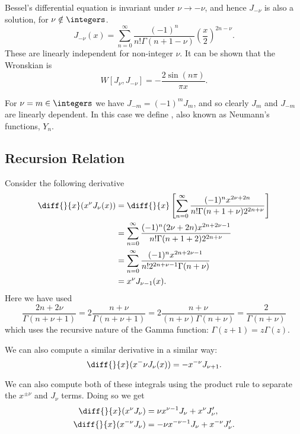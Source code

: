 \documentclass[fleqn]{NotesClass}
\begin{document}
    Bessel's differential equation is invariant under \(\nu \to -\nu\), and hence \(J_{-\nu}\) is also a solution, for \(\nu \notin \integers\).
    \begin{equation}
        J_{-\nu}(x) = \sum_{n = 0}^{\infty} \frac{(-1)^n}{n!\Gamma(n + 1 - \nu)} \left( \frac{x}{2} \right)^{2n - \nu}.
    \end{equation}
    These are linearly independent for non-integer \(\nu\).
    It can be shown that the Wronskian is
    \begin{equation}
        W[J_\nu, J_{-\nu}] = -\frac{2\sin(n\pi)}{\pi x}.
    \end{equation}
    
    For \(\nu = m \in \integers\) we have \(J_{-m} = (-1)^mJ_m\), and so clearly \(J_m\) and \(J_{-m}\) are linearly dependent.
    In this case we define , also known as Neumann's functions, \(Y_n\).
    
    \subsection{Recursion Relation}
    Consider the following derivative
    \begin{align}
        \diff{}{x}(x^\nu J_\nu(x)) &= \diff{}{x} \left[ \sum_{n=0}^{\infty} \frac{(-1)^{n} x^{2\nu+2n}}{n!\Gamma(n + 1 + \nu)2^{2n+\nu}} \right]\\
        &= \sum_{n=0}^{\infty} \frac{(-1)^n(2\nu + 2n)x^{2n+2\nu-1}}{n!\Gamma(n+1+2)2^{2n+\nu}}\\
        &= \sum_{n=0}^{\infty} \frac{(-1)^n x^{2n + 2\nu - 1}}{n! 2^{2n+\nu-1}\Gamma(n+\nu)}\\
        &= x^\nu J_{\nu-1}(x).
    \end{align}
    Here we have used
    \begin{equation}
        \frac{2n + 2\nu}{\Gamma(n + \nu + 1)} = 2\frac{n + \nu}{\Gamma(n + \nu + 1)} = 2\frac{n + \nu}{(n + \nu)\Gamma(n + \nu)} = \frac{2}{\Gamma(n + \nu)}
    \end{equation}
    which uses the recursive nature of the Gamma function: \(\Gamma(z + 1) = z\Gamma(z)\).
    
    We can also compute a similar derivative in a similar way:
    \begin{equation}
        \diff{}{x} (x^-\nu J_\nu(x)) = -x^{-\nu} J_{\nu+1}.
    \end{equation}
    
    We can also compute both of these integrals using the product rule to separate the \(x^{\pm \nu}\) and \(J_{\nu}\) terms.
    Doing so we get
    \begin{align}
        \diff{}{x} (x^{\nu} J_\nu) &= \nu x^{\nu - 1} J_\nu + x^\nu J_\nu',\\
        \diff{}{x} (x^{-\nu} J_\nu) &= -\nu x^{-\nu-1}J_\nu + x^{-\nu}J_\nu'.
    \end{align}
    
\end{document}
